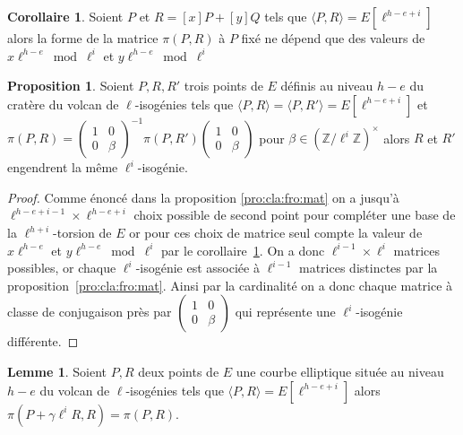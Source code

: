 \documentclass[10pt,a4paper]{book}
\theoremstyle{plain}
\theoremstyle{definition}
\newtheorem{lem}[thm]{Lemme}
\theoremstyle{definition}
\newtheorem{cor}[thm]{Corollaire}
\theoremstyle{definition}
\newtheorem{prop}[thm]{Proposition}
\theoremstyle{definition}
\theoremstyle{remark}
\theoremstyle{remark}
\theoremstyle{definition}
\begin{document}
\begin{cor}
\label{cor:atk:fro:dis}
Soient $P $ et $R=[x]P+[y]Q$ tels que $\langle P ,R \rangle=E[\ell^{h-e+i}]$ 
alors la forme de la matrice $\pi(P,R)$ à $P$ fixé ne dépend que des valeurs de 
$x\ell^{h-e} \bmod \ell^i$ et $y\ell^{h-e} \bmod \ell^i$
\end{cor}

\begin{prop}
\label{pro:atk:fro:iso}
Soient $P,R,R'$ trois points de $E$ définis au niveau $h-e$ du cratère du volcan de 
$\ell$-isogénies tels que $\langle P, R \rangle = \langle P,R' \rangle= 
E[\ell^{h-e+i}]$ et $\pi(P,R)= \left(  \begin{smallmatrix}1 & 0 \\0  & \beta 
\end{smallmatrix} \right)^{-1} \pi(P,R') \left(  \begin{smallmatrix}1 & 0 \\0  & \beta 
\end{smallmatrix} \right)$ pour $\beta \in (\mathbb{Z}/\ell^i\mathbb{Z})^
{\times}$ alors $R$ et $R'$ engendrent la même 
$\ell^i$-isogénie.
\end{prop}

\begin{proof}
Comme énoncé dans la proposition \ref{pro:cla:fro:mat} on a jusqu'à 
$\ell^{h-e+i-1} \times \ell^{h-e+i}$ choix possible de second point pour compléter 
une base de la $\ell^{h+i}$-torsion de $E$ or pour ces choix de matrice seul 
compte la valeur de $x\ell^{h-e}$ et $y\ell^{h-e} \bmod \ell^{i}$ par le 
corollaire~\ref{cor:atk:fro:dis}. On a donc $\ell^{i-1} \times \ell^i$ matrices
possibles, or chaque $\ell^i$-isogénie est associée à $\ell^{i-1}$ matrices 
distinctes par la proposition~\ref{pro:cla:fro:mat}. Ainsi par la cardinalité 
on a donc chaque matrice à classe de conjugaison près par $\left( 
 \begin{smallmatrix}1 & 0 \\0  & \beta \end{smallmatrix} \right)$ qui 
représente une $\ell^i$-isogénie différente.
\end{proof}

\begin{lem}
\label{lem:fro:atk}
Soient $P,R$ deux points de $E$ une courbe elliptique située au 
niveau $h-e$ du volcan de $\ell$-isogénies tels que $\langle P,R \rangle= 
E[\ell^{h-e+i}]$ alors $\pi(P+\gamma \ell^{i}R,R)=\pi(P,R)$.
\end{lem}
\end{document}
